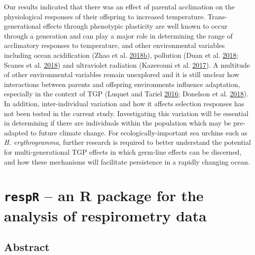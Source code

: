 \documentclass[a4paper,10pt, oneside]{memoir}
\begin{document}
Our results indicated that there was an effect of parental acclimation on the physiological responses of their offspring to increased temperature.
Trans-generational effects through phenotypic plasticity are well known to occur through a generation and can play a major role in determining the range of acclimatory responses to temperature, and other environmental variables including ocean acidification (Zhao et al. \protect\hyperlink{ref-Zhao2018a}{2018}\protect\hyperlink{ref-Zhao2018a}{b}), pollution (Duan et al. \protect\hyperlink{ref-Duan2018}{2018}; Scanes et al. \protect\hyperlink{ref-Scanes2018}{2018}) and ultraviolet radiation (Kazerouni et al. \protect\hyperlink{ref-Kazerouni2017}{2017}).
A multitude of other environmental variables remain unexplored and it is still unclear how interactions between parents and offspring environments influence adaptation, especially in the context of TGP (Luquet and Tariel \protect\hyperlink{ref-Luquet2016}{2016}; Donelson et al. \protect\hyperlink{ref-Donelson2018}{2018}).
In addition, inter-individual variation and how it affects selection responses has not been tested in the current study.
Investigating this variation will be essential in determining if there are individuals within the population which may be pre-adapted to future climate change.
For ecologically-important sea urchins such as \emph{H. erythrogramma}, further research is required to better understand the potential for multi-generational TGP effects in which germ-line effects can be discerned, and how these mechanisms will facilitate persistence in a rapidly changing ocean.

\hypertarget{package}{%
\chapter{\texorpdfstring{\texttt{respR} -- an R package for the analysis of respirometry data}{respR -- an R package for the analysis of respirometry data}}\label{package}}


\hypertarget{abstract-4}{%
\section*{Abstract}\label{abstract-4}}
\end{document}
